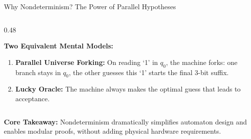 \documentclass[aspectratio=169, 10pt]{beamer}
\newcommand{\greentitle}[1]{{\noindent\footnotesize\bfseries\color{accentGreen}#1}\par\vspace{0.03cm}}
\begin{document}
\begin{frame}{Why Nondeterminism? The Power of Parallel Hypotheses}
\begin{columns}[T]
\begin{column}{0.48\textwidth}
\begin{center}
      \end{center}
      \begin{tcolorbox}[examplecard]
        \greentitle{Two Equivalent Mental Models:}
        \begin{enumerate}\setlength{\itemsep}{1.5pt}\scriptsize
          \item \textbf{Parallel Universe Forking:} On reading `1' in $q_0$, the machine forks: one branch stays in $q_0$, the other guesses this `1' starts the final 3-bit suffix.
          \item \textbf{Lucky Oracle:} The machine always makes the optimal guess that leads to acceptance.
        \end{enumerate}
      \end{tcolorbox}
    \end{column}
  \end{columns}
  
  \vspace{0.02cm}
  \begin{tcolorbox}[spotlightcard]
    {\scriptsize\textbf{Core Takeaway:} Nondeterminism dramatically simplifies automaton design and enables modular proofs, without adding physical hardware requirements.}
  \end{tcolorbox}
\end{frame}
\end{document}
